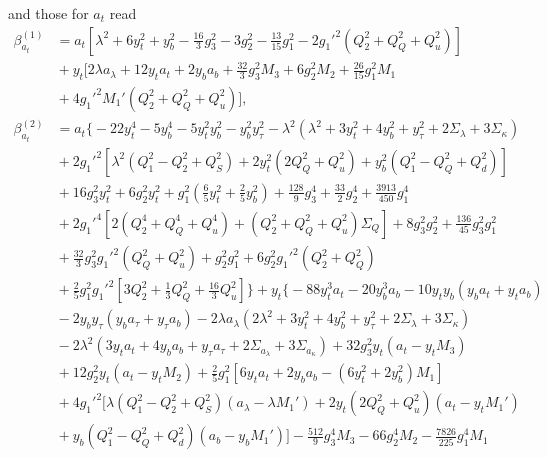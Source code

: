 \documentclass[preprint,amsmath,amssymb,aps,superscriptaddress,prd,showpacs,floatfix,nofootinbib]{revtex4-1}
\begin{document}
and those for $a_t$ read
\begin{subequations}
\begin{align}
\beta_{a_t}^{(1)}&=a_t\left [ \lambda^2+6y_t^2+y_b^2-\frac{16}{3}g_3^2-3g_2^2-\frac{13}{15}g_1^2-2g_1'^2\left ( Q_2^2+Q_Q^2+Q_u^2 \right )\right ]\nonumber\\
&{}+y_t\bigg [ 2\lambda a_\lambda + 12y_ta_t+2y_ba_b+\frac{32}{3}g_3^2M_3+6g_2^2M_2+\frac{26}{15}g_1^2M_1\nonumber\\
&{}+4g_1'^2M_1'\left ( Q_2^2+Q_Q^2+Q_u^2 \right )\bigg ],\label{eq:USSMTYu22BetaOneLoop}\\
\beta_{a_t}^{(2)}&=a_t\bigg \{-22y_t^4-5y_b^4-5y_t^2y_b^2-y_b^2y_\tau^2-\lambda^2 \left ( \lambda^2+3y_t^2+4y_b^2+y_\tau^2+2\Sigma_\lambda + 3\Sigma_\kappa\right )\nonumber\\
&{}+2g_1'^2\left [ \lambda^2\left ( Q_1^2-Q_2^2+Q_S^2 \right )+2y_t^2\left ( 2Q_Q^2+Q_u^2\right )+y_b^2\left ( Q_1^2-Q_Q^2+Q_d^2\right )\right ]\nonumber\\
&{}+16g_3^2y_t^2+6g_2^2y_t^2+g_1^2\left ( \frac{6}{5}y_t^2+\frac{2}{5}y_b^2\right )+\frac{128}{9}g_3^4+\frac{33}{2}g_2^4+\frac{3913}{450}g_1^4\nonumber\\
&{}+2g_1'^4\left [ 2\left ( Q_2^4+Q_Q^4+Q_u^4\right )+\left ( Q_2^2+Q_Q^2+Q_u^2\right )\Sigma_{Q}\right ]+8g_3^2g_2^2+\frac{136}{45}g_3^2g_1^2\nonumber\\
&{}+\frac{32}{3}g_3^2g_1'^2\left ( Q_Q^2+Q_u^2\right )+g_2^2g_1^2+6g_2^2g_1'^2\left ( Q_2^2+Q_Q^2\right )\nonumber\\
&{}+\frac{2}{5}g_1^2g_1'^2\left [ 3Q_2^2+\frac{1}{3}Q_Q^2+\frac{16}{3}Q_u^2\right ]\bigg \}+y_t\bigg \{ -88y_t^3a_t-20y_b^3a_b-10y_ty_b\left ( y_ba_t+y_ta_b\right )\nonumber\\
&{}-2y_by_\tau\left ( y_b a_\tau+y_\tau a_b\right )-2\lambda a_\lambda \left ( 2\lambda^2+3y_t^2+4y_b^2+y_\tau^2+2\Sigma_\lambda+3\Sigma_\kappa\right )\nonumber\\
&{}-2\lambda^2\left ( 3y_t a_t+4y_b a_b+y_\tau a_\tau +2\Sigma_{a_\lambda}+3\Sigma_{a_\kappa}\right )+32g_3^2y_t\left ( a_t-y_tM_3\right )\nonumber\\
&{}+12g_2^2y_t\left ( a_t-y_tM_2\right )+\frac{2}{5}g_1^2\left [ 6y_ta_t+2y_ba_b-\left ( 6y_t^2+2y_b^2\right )M_1\right ]\nonumber\\
&{}+4g_1'^2\big [ \lambda\left (Q_1^2-Q_2^2+Q_S^2\right ) \left ( a_\lambda-\lambda M_1'\right )+2y_t\left ( 2Q_Q^2+Q_u^2\right )\left ( a_t-y_tM_1'\right )\nonumber\\
&{}+y_b\left ( Q_1^2-Q_Q^2+Q_d^2\right )\left ( a_b-y_bM_1'\right )\big ]-\frac{512}{9}g_3^4M_3-66g_2^4M_2-\frac{7826}{225}g_1^4M_1\nonumber\\

\end{align}
\end{subequations}
\end{document}
